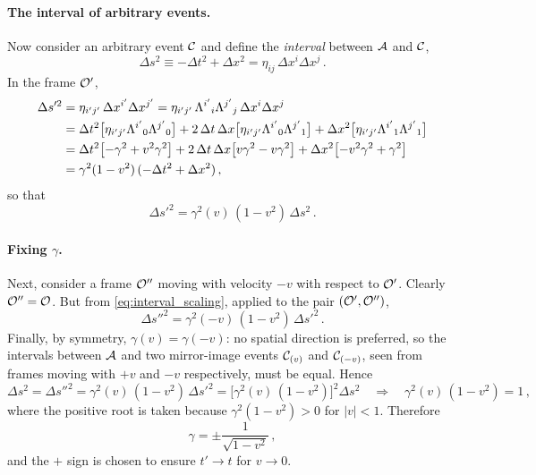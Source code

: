 \paragraph{The interval of arbitrary events.}
Now consider an arbitrary event $\mathcal{C}$ and define the \emph{interval} between $\mathcal{A}$ and
$\mathcal{C}$,
\begin{equation}
    \Delta s^2 \equiv -\Delta t^2 + \Delta x^2 = \eta_{ij}\, \Delta x^i \Delta x^j \, .
    \label{eq:interval}
\end{equation}
In the frame $\mathcal{O}'$,
\begin{align}
    \Delta s'^2 & = \eta_{i'j'}\, \Delta x^{i'} \Delta x^{j'}
    = \eta_{i'j'}\, \Lambda^{i'}{}_{i} \Lambda^{j'}{}_{j}\, \Delta x^i \Delta x^j \nonumber \\
                & = \Delta t^2 \bigl[\eta_{i'j'} \Lambda^{i'}{}_{0} \Lambda^{j'}{}_{0}\bigr]
    + 2\,\Delta t\,\Delta x \bigl[\eta_{i'j'} \Lambda^{i'}{}_{0} \Lambda^{j'}{}_{1}\bigr]
    + \Delta x^2 \bigl[\eta_{i'j'} \Lambda^{i'}{}_{1} \Lambda^{j'}{}_{1}\bigr] \nonumber \\
                & = \Delta t^2 \bigl[-\gamma^2 + v^2\gamma^2\bigr]
    + 2\,\Delta t\,\Delta x \bigl[v\gamma^2 - v\gamma^2\bigr]
    + \Delta x^2 \bigl[-v^2\gamma^2 + \gamma^2\bigr] \nonumber \\
                & = \gamma^2 (1 - v^2)\,(-\Delta t^2 + \Delta x^2) \, ,
\end{align}
so that
\begin{equation}
    \Delta s'^2 = \gamma^2(v)\,(1 - v^2)\, \Delta s^2 \, .
    \label{eq:interval_scaling}
\end{equation}

\paragraph{Fixing $\gamma$.}
Next, consider a frame $\mathcal{O}''$ moving with velocity $-v$ with respect to $\mathcal{O}'$. Clearly
$\mathcal{O}'' = \mathcal{O}$. But from \eqref{eq:interval_scaling}, applied to the pair $(\mathcal{O}', \mathcal{O}'')$,
\begin{equation}
    \Delta s''^2 = \gamma^2(-v)\,(1 - v^2)\, \Delta s'^2 \, .
\end{equation}
Finally, by symmetry, $\gamma(v) = \gamma(-v)$: no spatial direction is preferred, so the
intervals between $\mathcal{A}$ and two mirror-image events $\mathcal{C}_{(v)}$ and $\mathcal{C}_{(-v)}$, seen
from frames moving with $+v$ and $-v$ respectively, must be equal. Hence
\begin{equation}
    \Delta s^2 = \Delta s''^2 = \gamma^2(v)\,(1 - v^2)\, \Delta s'^2
    = \bigl[\gamma^2(v)\,(1 - v^2)\bigr]^2 \Delta s^2
    \quad\Longrightarrow\quad
    \gamma^2(v)\,(1 - v^2) = 1 \, ,
\end{equation}
where the positive root is taken because $\gamma^2 (1 - v^2) > 0$ for $|v| < 1$. Therefore
\begin{equation}
    \gamma = \pm \frac{1}{\sqrt{1 - v^2}} \, ,
\end{equation}
and the $+$ sign is chosen to ensure $t' \to t$ for $v \to 0$.

